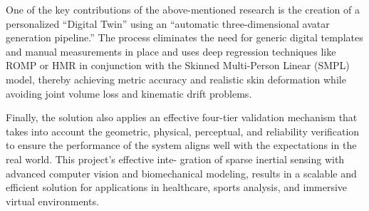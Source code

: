\documentclass[12pt, a4paper, oneside]{report}
\begin{document}
\noindent One of the key contributions of the above-mentioned research is the creation of a personalized “Digital Twin” using an “automatic three-dimensional avatar generation pipeline.” The process eliminates the need for generic digital templates and manual measurements in place and uses deep regression techniques like \ac{ROMP} or \ac{HMR} in conjunction with the Skinned Multi-Person Linear (\ac{SMPL}) model, thereby achieving metric accuracy and realistic skin deformation while avoiding joint volume loss and kinematic drift problems. \vspace{\baselineskip}


\noindent Finally, the solution also applies an effective four-tier validation mechanism that takes into account the geometric, physical, perceptual, and reliability verification to ensure the performance of the system aligns well with the expectations in the real world. This project’s effective inte-
gration of sparse inertial sensing with advanced computer vision and biomechanical modeling, results in a scalable and efficient solution for applications in healthcare,
sports analysis, and immersive virtual environments. \vspace{\baselineskip}



\renewcommand{\bibname}{References}

 
\end{document}
